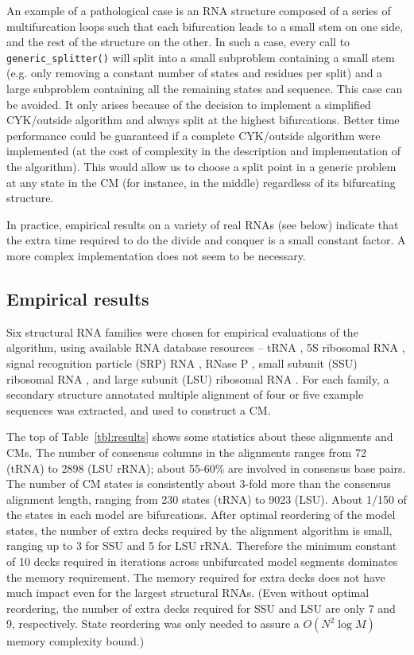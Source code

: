\documentclass[11pt]{article}
\begin{document}
An example of a pathological case is an RNA structure composed of a
series of multifurcation loops such that each bifurcation leads to a
small stem on one side, and the rest of the structure on the other. In
such a case, every call to \texttt{generic\_splitter()} will split
into a small subproblem containing a small stem (e.g. only removing a
constant number of states and residues per split) and a large
subproblem containing all the remaining states and sequence. This case
can be avoided. It only arises because of the decision to implement a
simplified CYK/outside algorithm and always split at the highest
bifurcations. Better time performance could be guaranteed if a
complete CYK/outside algorithm were implemented (at the cost of
complexity in the description and implementation of the algorithm).
This would allow us to choose a split point in a generic problem at
any state in the CM (for instance, in the middle) regardless of its
bifurcating structure.

In practice, empirical results on a variety of real RNAs (see below)
indicate that the extra time required to do the divide and conquer is
a small constant factor. A more complex implementation does not seem
to be necessary.

\subsection{Empirical results}

Six structural RNA families were chosen for empirical evaluations of
the algorithm, using available RNA database resources -- tRNA
\cite{Steinberg93}, 5S ribosomal RNA \cite{Szymanski02}, signal
recognition particle (SRP) RNA \cite{Larsen91}, RNase P
\cite{Brown99}, small subunit (SSU) ribosomal RNA \cite{Neefs93}, and
large subunit (LSU) ribosomal RNA \cite{deRijk94}. For each family, a
secondary structure annotated multiple alignment of four or five
example sequences was extracted, and used to construct a CM. 

The top of Table~\ref{tbl:results} shows some statistics about these
alignments and CMs. The number of consensus columns in the alignments
ranges from 72 (tRNA) to 2898 (LSU rRNA); about 55-60\% are involved
in consensus base pairs. The number of CM states is consistently about
3-fold more than the consensus alignment length, ranging from 230
states (tRNA) to 9023 (LSU). About 1/150 of the states in each model
are bifurcations. After optimal reordering of the model states, the
number of extra decks required by the alignment algorithm is small,
ranging up to 3 for SSU and 5 for LSU rRNA. Therefore the minimum
constant of 10 decks required in iterations across unbifurcated model
segments dominates the memory requirement. The memory required for
extra decks does not have much impact even for the largest structural
RNAs. (Even without optimal reordering, the number of extra decks
required for SSU and LSU are only 7 and 9, respectively. State
reordering was only needed to assure a $O(N^2\log M)$ memory
complexity bound.)
\end{document}
